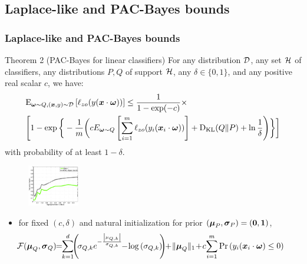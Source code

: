 \documentclass[mathserif]{beamer}
\begin{document}
\subsection{Laplace-like and PAC-Bayes bounds}
\begin{frame}
\frametitle{ Laplace-like and PAC-Bayes bounds  }
\begin{block}{Theorem 2  (PAC-Bayes for linear classifiers)}
For any distribution ${\cal D}$, any set $\cal H$
of classifiers, any distributions $P,Q$ of support $\cal H$, any
$\delta \in\{0,1\}$, and any positive real scalar $c$, we have:
\begin{align*}
&{\rm E}_{{\boldsymbol{\omega}}\sim Q, ({\boldsymbol{x}},y)\sim {\cal D}}\left[{\ell_{zo}(y({\boldsymbol{x}}\cdot{\boldsymbol{\omega}}))}\right]
\leq \label{main_eq}
 \frac{1}{1-\exp(-c)}\times \\
 &\Bigg [ 1-   \exp\bigg\{ -\frac{1}{m}\bigg(  cE_{{\boldsymbol{\omega}}\sim
     Q}\left[{\sum _{i=1}^m \ell_{zo}(y_{i}({\boldsymbol{x}}_{i}\cdot{\boldsymbol{\omega}})) }\right]
+{\textrm{D}_{\textrm{KL}}}(Q \Vert P)+\ln\frac{1}{\delta}\Bigg)\bigg\}\bigg]\nonumber
\end{align*}
with probability of at least $1-\delta$.
\begin{figure}
\includegraphics[width=0.2\textwidth]{figs/boundSimu}
\end{figure}
\end{block}

\begin{itemize}
\item for fixed $(c,\delta)$ and natural
initialization for  prior $({\boldsymbol{\mu}}_P,{\boldsymbol{\sigma}}_{P})= \left({{\boldsymbol{0}},{\boldsymbol{1}}}\right)$,
 \begin{align*}
 \!\!\!\!\!\!\!\!\!\!\!\!\!\!\F(\vmuq,\vsigmaq)\!\!=\!\!\sum_{k=1}^{d}\!\! \paren{\!\sigmaqi{k}e^{-\frac{\abs{\muqi{k}}}{\sigmaqi{k}}}\!\!-\!\log{ \paren{
      \sigmaqi{k} } }\!\! }\!\!+\!\Vert \vmuq
\Vert_1\!+\!c\! \sum _{i=1}^m\Pr\paren{ \yii(\vxii\cdot\vomega)\leq0}
\end{align*}
\end{itemize}
\end{frame}
\end{document}
